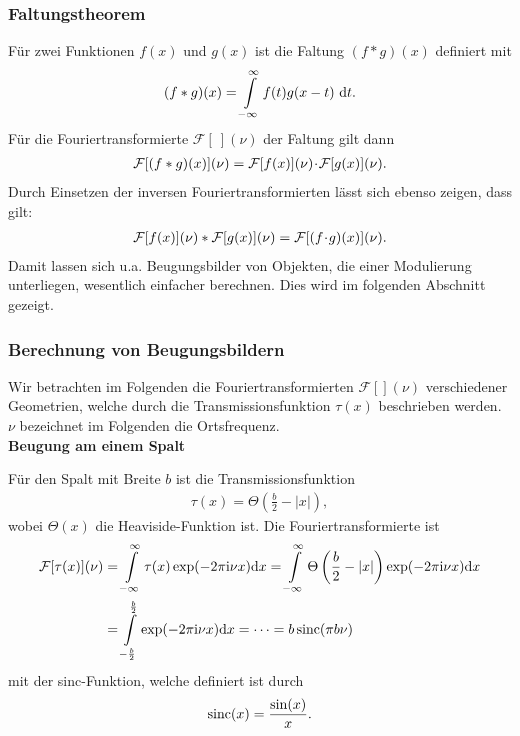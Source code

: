 \subsubsection{Faltungstheorem}
Für zwei Funktionen $f(x)$ und $g(x)$ ist die Faltung $(f*g)(x)$ definiert mit
\begin{align}
(f*g)(x)=\int\limits_{-\infty}^{\infty}f(t)g(x-t)~\mathrm{d} t.
\end{align}
Für die Fouriertransformierte $\mathcal{F}[~](\nu)$ der Faltung gilt dann
\begin{align}
\mathcal{F}[(f*g)(x)](\nu)=\mathcal{F}[f(x)](\nu)\!\cdot\! \mathcal{F}[g(x)](\nu).
\end{align}
Durch Einsetzen der inversen Fouriertransformierten lässt sich ebenso zeigen, dass gilt:
\begin{align}
\mathcal{F}[f(x)](\nu)* \mathcal{F}[g(x)](\nu)=\mathcal{F}[(f\!\cdot\! g)(x)](\nu).
\end{align}
Damit lassen sich u.a. Beugungsbilder von Objekten, die einer Modulierung unterliegen, wesentlich einfacher berechnen. Dies wird im folgenden Abschnitt gezeigt.
\subsubsection{Berechnung von Beugungsbildern}
Wir betrachten im Folgenden die Fouriertransformierten $\mathcal{F}[](\nu)$ verschiedener Geometrien, welche durch die Transmissionsfunktion $\tau(x)$ beschrieben werden.
$\nu$ bezeichnet im Folgenden die Ortsfrequenz.\\

\textbf{Beugung am einem Spalt}

Für den Spalt mit Breite $b$ ist die Transmissionsfunktion
\begin{align}
\tau(x)=\Theta\left(\frac{b}{2}-|x|\right),
\end{align}
wobei $\Theta(x)$ die Heaviside-Funktion ist. Die Fouriertransformierte ist
\begin{align}
\mathcal{F}[\tau(x)](\nu)&=\int\limits_{-\infty}^{\infty}\tau(x)\exp(-2\pi\mathrm{i}\nu x)\mathrm{d} x=\int\limits_{-\infty}^{\infty}\Theta\left(\frac{b}{2}-|x|\right)\exp(-2\pi\mathrm{i}\nu x)\mathrm{d} x\nonumber\\
&=\int\limits_{-\frac{b}{2}}^{\frac{b}{2}}\exp(-2\pi\mathrm{i}\nu x)\mathrm{d} x=
\dots=b \operatorname{sinc}(\pi b\nu)
\end{align}
mit der sinc-Funktion, welche definiert ist durch
\begin{align}
\operatorname{sinc}(x)=\frac{\sin(x)}{x}.
\end{align}

